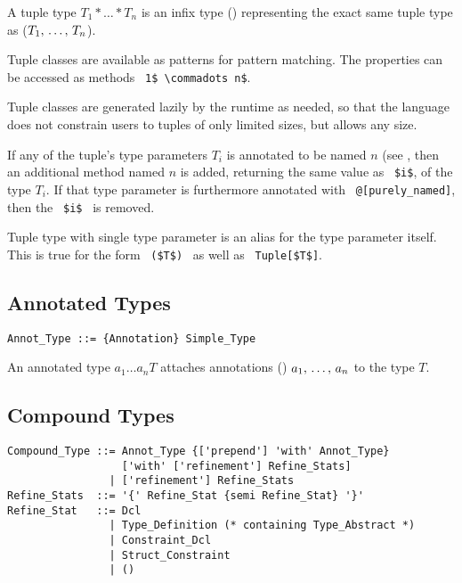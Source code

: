 A tuple type $T_1 * \ldots * T_n$ is an infix type () representing the exact same tuple type as ($T_1 ,\, \ldots ,\, T_n$).

Tuple classes are available as patterns for pattern matching. The properties can be accessed as methods ~\lstinline!1$ \commadots n$!. 

Tuple classes are generated lazily by the runtime as needed, so that the language does not constrain users to tuples of only limited sizes, but allows any size. 

If any of the tuple's type parameters $T_i$ is annotated to be named $n$ (see , then an additional method named $n$ is added, returning the same value as ~\lstinline!$i$!, of the type $T_i$. If that type parameter is furthermore annotated with ~\lstinline!@[purely_named]!, then the ~\lstinline!$i$!~ is removed. 

Tuple type with single type parameter is an alias for the type parameter itself. This is true for the form ~\lstinline!($T$)!~ as well as ~\lstinline!Tuple[$T$]!.






\subsection{Annotated Types}

\syntax\begin{lstlisting}
Annot_Type ::= {Annotation} Simple_Type
\end{lstlisting}

An annotated type $a_1 \ldots a_n T$ attaches annotations () $a_1 ,\, \ldots ,\, a_n$ to the type $T$. 






\subsection{Compound Types}
\label{sec:compound-types}

\syntax\begin{lstlisting}
Compound_Type ::= Annot_Type {['prepend'] 'with' Annot_Type} 
                  ['with' ['refinement'] Refine_Stats]
                | ['refinement'] Refine_Stats
Refine_Stats  ::= '{' Refine_Stat {semi Refine_Stat} '}'
Refine_Stat   ::= Dcl
                | Type_Definition (* containing Type_Abstract *)
                | Constraint_Dcl
                | Struct_Constraint
                | ()
\end{lstlisting}

